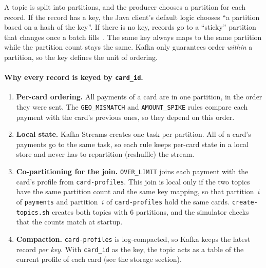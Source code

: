A topic is split into partitions, and the producer chooses a partition for each record. If the record has a key, the Java client's default logic chooses ``a partition based on a hash of the key''. If there is no key, records go to a ``sticky'' partition that changes once a batch fills~\cite{kafka-producer-configs}. The same key always maps to the same partition while the partition count stays the same. Kafka only guarantees order \emph{within} a partition, so the key defines the unit of ordering.

\paragraph{Why every record is keyed by \texttt{card\_id}.}
\begin{enumerate}
  \item \textbf{Per-card ordering.} All payments of a card are in one partition, in the order they were sent. The \texttt{GEO\_MISMATCH} and \texttt{AMOUNT\_SPIKE} rules compare each payment with the card's previous ones, so they depend on this order.
  \item \textbf{Local state.} Kafka Streams creates one task per partition. All of a card's payments go to the same task, so each rule keeps per-card state in a local store and never has to repartition (reshuffle) the stream.
  \item \textbf{Co-partitioning for the join.} \texttt{OVER\_LIMIT} joins each payment with the card's profile from \texttt{card-profiles}. This join is local only if the two topics have the same partition count and the same key mapping, so that partition~$i$ of \texttt{payments} and partition~$i$ of \texttt{card-profiles} hold the same cards. \texttt{create-topics.sh} creates both topics with 6 partitions, and the simulator checks that the counts match at startup.
  \item \textbf{Compaction.} \texttt{card-profiles} is log-compacted, so Kafka keeps the latest record \emph{per key}. With \texttt{card\_id} as the key, the topic acts as a table of the current profile of each card (see the storage section).
\end{enumerate}

